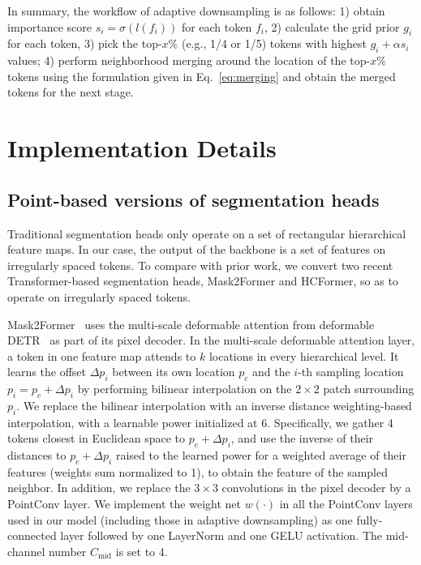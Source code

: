 \documentclass[10pt,twocolumn,letterpaper]{article}
\begin{document}
In summary, the workflow of adaptive downsampling is as follows: 1) obtain importance score $s_i=\sigma(l(f_i))$ for each token $f_i$, 2) calculate the grid prior $g_i$ for each token, 3) pick the top-$x$\% (e.g., 1/4 or 1/5) tokens with highest $g_i+\alpha  s_i$ values;
4) perform neighborhood merging around the location of the top-$x$\% tokens using the formulation given in Eq.~\eqref{eq:merging} and obtain the merged tokens for the next stage.

\section{Implementation Details}
\subsection{Point-based versions of segmentation heads}\label{sec:mask2former}

Traditional segmentation heads only operate on a set of rectangular hierarchical feature maps. In our case, the output of the backbone is a set of features on irregularly spaced tokens. To compare with prior work, we convert two recent Transformer-based segmentation heads, Mask2Former and HCFormer, so as to operate on irregularly spaced tokens. 

Mask2Former~\cite{mask2} uses the multi-scale deformable attention from deformable DETR~\cite{deformable} as part of its pixel decoder. In the multi-scale deformable attention layer, a token in one feature map attends to $k$ locations in every hierarchical level. It learns the offset $\Delta p_i$ between its own location $p_c$ and the $i$-th sampling location $p_i=p_c+\Delta p_i$ by performing bilinear interpolation on the $2\times 2$ patch surrounding $p_i$. We replace the bilinear interpolation with an inverse distance weighting-based interpolation, with a learnable power initialized at 6. Specifically, we gather 4 tokens closest in Euclidean space to $p_c+\Delta p_i$, and use the inverse of their distances to $p_c+\Delta p_i$ raised to the learned power for a weighted average of their features (weights sum normalized to 1), to obtain the feature of the sampled neighbor. In addition, we replace the $3\times 3$ convolutions in the pixel decoder by a PointConv layer. We implement the weight net $w(\cdot)$ in all the PointConv layers used in our model (including those in adaptive downsampling) as one fully-connected layer followed by one LayerNorm and one GELU activation. The mid-channel number $C_{\text{mid}}$ is set to 4.
\end{document}

